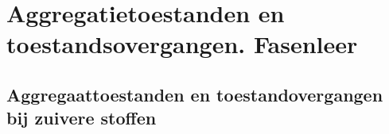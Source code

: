 \documentclass[a4paper,12pt]{article}
\begin{document}
    \maketitle
    
    \section{Aggregatietoestanden en toestandsovergangen. Fasenleer}

    \subsection{Aggregaattoestanden en toestandovergangen bij zuivere stoffen}
\end{document}
